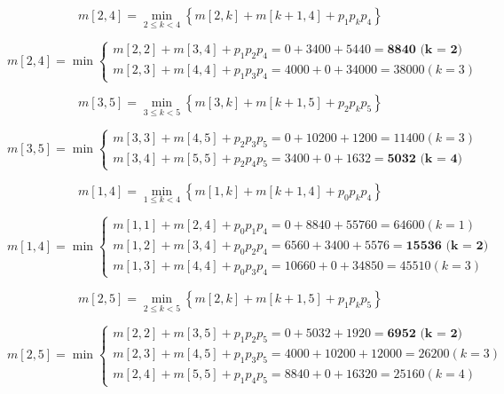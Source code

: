 \documentclass{article}
\begin{document}
\begin{equation}
m[2, 4] = \min\limits_{2 \leq k < 4} \left\{ m[2, k] + m[k + 1, 4] + p_1p_kp_4 \right\}
\end{equation}

\begin{equation}
m[2, 4] = \min\begin{cases}
  m[2, 2] + m[3, 4] + p_1p_2p_4 = 0 + 3400 + 5440 = \textbf{8840 (k = 2)} \\
  m[2, 3] + m[4, 4] + p_1p_3p_4 = 4000 + 0 + 34000 = 38000 (k = 3)
\end{cases}
\end{equation}

\begin{equation}
m[3, 5] = \min\limits_{3 \leq k < 5} \left\{ m[3, k] + m[k + 1, 5] + p_2p_kp_5 \right\}
\end{equation}

\begin{equation}
m[3, 5] = \min\begin{cases}
  m[3, 3] + m[4, 5] + p_2p_3p_5 = 0 + 10200 + 1200 = 11400 (k = 3) \\
  m[3, 4] + m[5, 5] + p_2p_4p_5 = 3400 + 0 + 1632 = \textbf{5032 (k = 4)}
\end{cases}
\end{equation}

\begin{equation}
m[1, 4] = \min\limits_{1 \leq k < 4} \left\{ m[1, k] + m[k + 1, 4] + p_0p_kp_4 \right\}
\end{equation}

\begin{equation}
m[1, 4] = \min\begin{cases}
  m[1, 1] + m[2, 4] + p_0p_1p_4 = 0 + 8840 + 55760 = 64600 (k = 1) \\
  m[1, 2] + m[3, 4] + p_0p_2p_4 = 6560 + 3400 + 5576 = \textbf{15536 (k = 2)} \\
  m[1, 3] + m[4, 4] + p_0p_3p_4 = 10660 + 0 + 34850 = 45510 (k = 3)
\end{cases}
\end{equation}

\begin{equation}
m[2, 5] = \min\limits_{2 \leq k < 5} \left\{ m[2, k] + m[k + 1, 5] + p_1p_kp_5 \right\}
\end{equation}

\begin{equation}
m[2, 5] = \min\begin{cases}
  m[2, 2] + m[3, 5] + p_1p_2p_5 = 0 + 5032 + 1920 = \textbf{6952 (k = 2)} \\
  m[2, 3] + m[4, 5] + p_1p_3p_5 = 4000 + 10200 + 12000 = 26200 (k = 3) \\
  m[2, 4] + m[5, 5] + p_1p_4p_5 = 8840 + 0 + 16320 = 25160 (k = 4)
\end{cases}
\end{equation}
\end{document}

